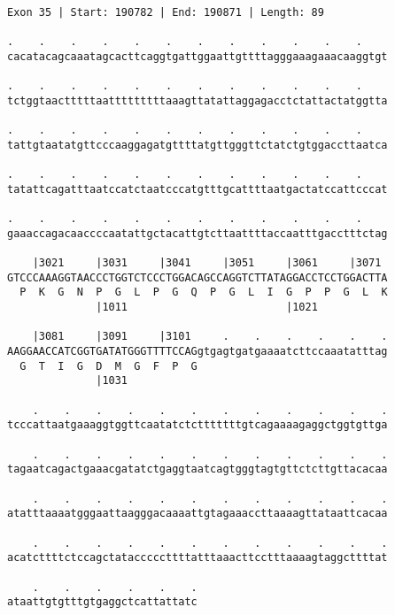 \documentclass{article}
\begin{document}
\begin{Verbatim}[fontfamily=courier]
Exon 35 | Start: 190782 | End: 190871 | Length: 89

.    .    .    .    .    .    .    .    .    .    .    .    
cacatacagcaaatagcacttcaggtgattggaattgttttagggaaagaaacaaggtgt

.    .    .    .    .    .    .    .    .    .    .    .    
tctggtaactttttaatttttttttaaagttatattaggagacctctattactatggtta

.    .    .    .    .    .    .    .    .    .    .    .    
tattgtaatatgttcccaaggagatgttttatgttgggttctatctgtggaccttaatca

.    .    .    .    .    .    .    .    .    .    .    .    
tatattcagatttaatccatctaatcccatgtttgcattttaatgactatccattcccat

.    .    .    .    .    .    .    .    .    .    .    .    
gaaaccagacaaccccaatattgctacattgtcttaattttaccaatttgacctttctag

    |3021     |3031     |3041     |3051     |3061     |3071 
GTCCCAAAGGTAACCCTGGTCTCCCTGGACAGCCAGGTCTTATAGGACCTCCTGGACTTA
  P  K  G  N  P  G  L  P  G  Q  P  G  L  I  G  P  P  G  L  K
              |1011                         |1021           

    |3081     |3091     |3101     .    .    .    .    .    .
AAGGAACCATCGGTGATATGGGTTTTCCAGgtgagtgatgaaaatcttccaaatatttag
  G  T  I  G  D  M  G  F  P  G                              
              |1031                                         

    .    .    .    .    .    .    .    .    .    .    .    .
tcccattaatgaaaggtggttcaatatctctttttttgtcagaaaagaggctggtgttga

    .    .    .    .    .    .    .    .    .    .    .    .
tagaatcagactgaaacgatatctgaggtaatcagtgggtagtgttctcttgttacacaa

    .    .    .    .    .    .    .    .    .    .    .    .
atatttaaaatgggaattaagggacaaaattgtagaaaccttaaaagttataattcacaa

    .    .    .    .    .    .    .    .    .    .    .    .
acatcttttctccagctatacccccttttatttaaacttcctttaaaagtaggcttttat

    .    .    .    .    .    .
ataattgtgtttgtgaggctcattattatc
\end{Verbatim}
\newpage
\end{document}
